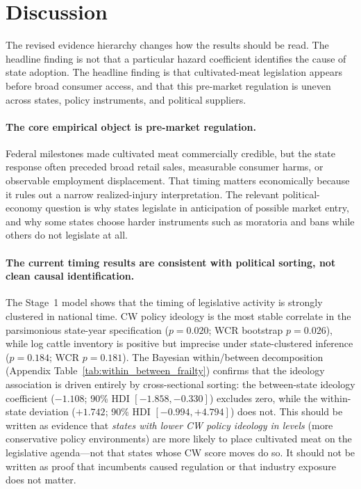 \documentclass[12pt]{article}
\begin{document}
\section{Discussion}
\label{sec:discussion}

The revised evidence hierarchy changes how the results should be read.  The headline finding is not that a particular hazard coefficient identifies the cause of state adoption.  The headline finding is that cultivated-meat legislation appears before broad consumer access, and that this pre-market regulation is uneven across states, policy instruments, and political suppliers.

\paragraph{The core empirical object is pre-market regulation.}  Federal milestones made cultivated meat commercially credible, but the state response often preceded broad retail sales, measurable consumer harms, or observable employment displacement.  That timing matters economically because it rules out a narrow realized-injury interpretation.  The relevant political-economy question is why states legislate in anticipation of possible market entry, and why some states choose harder instruments such as moratoria and bans while others do not legislate at all.

\paragraph{The current timing results are consistent with political sorting, not clean causal identification.}  The Stage~1 model shows that the timing of legislative activity is strongly clustered in national time.  CW policy ideology is the most stable correlate in the parsimonious state-year specification ($p = 0.020$; WCR bootstrap $p = 0.026$), while log cattle inventory is positive but imprecise under state-clustered inference ($p = 0.184$; WCR $p = 0.181$).  The Bayesian within/between decomposition (Appendix Table~\ref{tab:within_between_frailty}) confirms that the ideology association is driven entirely by cross-sectional sorting: the between-state ideology coefficient ($-1.108$; 90\% HDI $[-1.858, -0.330]$) excludes zero, while the within-state deviation ($+1.742$; 90\% HDI $[-0.994, +4.794]$) does not.  This should be written as evidence that \emph{states with lower CW policy ideology in levels} (more conservative policy environments) are more likely to place cultivated meat on the legislative agenda---not that states whose CW score moves do so.  It should not be written as proof that incumbents caused regulation or that industry exposure does not matter.
\end{document}
